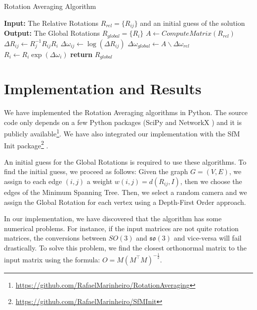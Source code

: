 \documentclass[conference, 12pt]{acmsiggraph}
\begin{document}
\begin{algorithm}[h]
  \caption{Rotation Averaging Algorithm}\label{algo:rot}
  \begin{algorithmic}[1]
    \State \textbf{Input:} The Relative Rotations $R_{rel} = \{R_{ij}\}$ and an initial guess of the solution
    \State \textbf{Output:} The Global Rotations $R_{global} = \{R_{i}\}$ 
    \State $A \gets ComputeMatrix(R_{rel})$
     
    \State $\Delta R_{ij} \gets R_{j}^{-1}R_{ij}R_{i}$
    \State $\Delta\omega_{ij} \gets \log(\Delta R_{ij})$
    \EndFor
    	\State $\Delta\omega_{global} \gets A\backslash \Delta\omega_{rel}$  \label{algo:roteq}
    	 
	    \State $R_{i} \gets R_{i}\exp(\Delta\omega_{i})$
	    \EndFor
    \EndWhile
    \State \textbf{return} $R_{global}$
    \EndProcedure
  \end{algorithmic}
\end{algorithm}

\section{Implementation and Results}

We have implemented the Rotation Averaging algorithms in Python. The source code only depends on a few Python packages (SciPy \cite{scipy} and NetworkX \cite{networkx}) and it is publicly available\footnote{\url{https://github.com/RafaelMarinheiro/RotationAveraging}}. We have also integrated our implementation with the SfM Init package\footnote{\url{https://github.com/RafaelMarinheiro/SfMInit}} \cite{translation}.

An initial guess for the Global Rotations is required to use these algorithms. To find the initial guess, we proceed as follows: Given the graph $G = (V, E)$, we assign to each edge $(i, j)$ a weight $w(i, j) = d(R_{ij}, I)$, then we choose the edges of the Minimum Spanning Tree. Then, we select a random camera and we assign the Global Rotation for each vertex using a Depth-First Order approach.

In our implementation, we have discovered that the algorithm has some numerical problems. For instance, if the input matrices are not quite rotation matrices, the conversions between $SO(3)$ and $\mathfrak{so}(3)$ and vice-versa will fail drastically. To solve this problem, we find the closest orthonormal matrix to the input matrix using the formula: $O = M(M^\intercal M)^{-\frac{1}{2}}$. 
\end{document}
